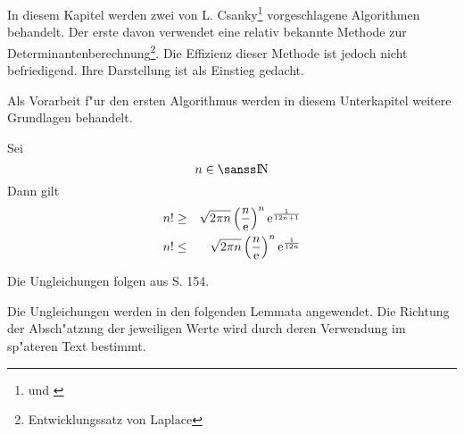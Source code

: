 %
%

\label{ChapCsanky}

In diesem Kapitel werden zwei von L. Csanky\footnote{ \cite{Csan74} und 
\cite{Csan76} } vorgeschlagene Algorithmen 
behandelt. Der erste davon verwendet eine relativ bekannte Methode zur
Determinantenberechnung\footnote{Entwicklungssatz von Laplace}. 
Die Effizienz dieser Methode ist jedoch nicht befriedigend. Ihre 
Darstellung ist als Einstieg gedacht.


Als Vorarbeit f"ur den ersten Algorithmus werden in diesem Unterkapitel 
weitere Grundlagen behandelt.

\begin{satz}
\label{SatzStirling}
    Sei \[ n \in \Nat \] Dann gilt
    \begin{eqnarray}
        \label{Equ1SatzStirling}
        n! & \geq & \sqrt{2\pi n}
                    \left( \frac{n}{\mbox{\rm e}} \right)^n
                    \mbox{\rm e}^{\frac{1}{12n+1}}
    \\  
        \label{Equ2SatzStirling}
        n! & \leq & \sqrt{2\pi n}
                    \left( \frac{n}{\mbox{\rm e}} \right)^n
                    \mbox{\rm e}^{\frac{1}{12n}}
    \end{eqnarray}
\end{satz}
\begin{beweis}
    Die Ungleichungen folgen aus \cite{Mang67} S. 154.
\end{beweis}

Die Ungleichungen werden in den folgenden Lemmata angewendet. Die Richtung
der Ab\-sch"a\-tzung der jeweiligen Werte wird durch deren Verwendung
im sp"ateren Text bestimmt.

